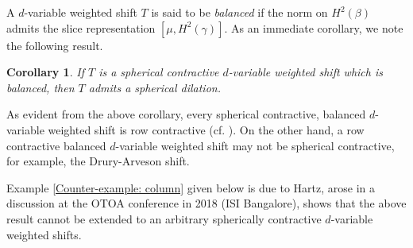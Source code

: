 \documentclass[12pt,reqno] {amsart}
\newtheorem{cor}{Corollary}
\theoremstyle{remark}
\theoremstyle{definition}
\begin{document}
A $d$-variable weighted shift $T$ is said to be {\it balanced} if the norm on $H^2(\beta)$ admits the slice representation $[\mu, H^2(\gamma)].$ As an immediate corollary, we note the following result.
\begin{cor}\label{Balanced - Dilation}
If $T$ is a spherical contractive $d$-variable weighted shift which is balanced, then $T$ admits a spherical dilation. 
\end{cor}
 As evident from the above corollary, every spherical contractive, balanced $d$-variable weighted shift is row contractive (cf. \cite[Remark 2.6]{Ku}). On the other hand, a row contractive balanced $d$-variable weighted shift may not be spherical contractive, for example, the Drury-Arveson shift.
	
Example \ref{Counter-example: column} given below is due to Hartz, arose in a discussion at the OTOA conference in 2018 (ISI Bangalore), shows that the above result cannot be extended to an arbitrary spherically contractive $d$-variable weighted shifts.
\end{document}
